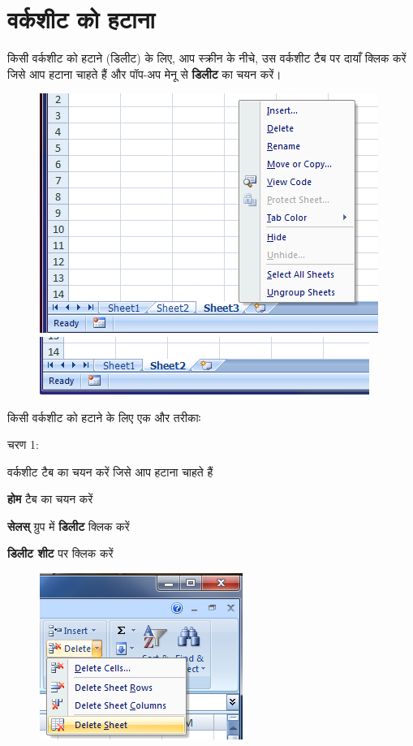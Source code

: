 \section{वर्कशीट को हटाना}\label{id-1.10}			

किसी वर्कशीट को हटाने (डिलीट) के लिए, आप स्क्रीन के नीचे, उस वर्कशीट टैब पर दायाँ क्लिक करें जिसे आप हटाना चाहते हैं और पॉप-अप मेनू से \textbf{डिलीट} का चयन करें।

\begin{figure}[H]
\centering
\includegraphics[scale=0.4]{src/images/chapter1/chapter1_fig17.png}
\includegraphics[scale=0.4]{src/images/chapter1/chapter1_fig18.png}
\end{figure}

किसी वर्कशीट को हटाने के लिए एक और तरीकाः
\begin{descriptionSimple}{चरण 1:}
\item[चरण 1] वर्कशीट टैब का चयन करें जिसे आप हटाना चाहते हैं
\item[चरण 2] \textbf{होम} टैब का चयन करें
\item[चरण 3] \textbf{सेलस्} ग्रुप में \textbf{डिलीट} क्लिक करें
\item[चरण 4] \textbf{डिलीट शीट} पर क्लिक करें
\end{descriptionSimple}				
\begin{figure}[H]
\centering
\includegraphics[scale=0.65]{src/images/chapter1/chapter1_fig19.png}
\end{figure}

